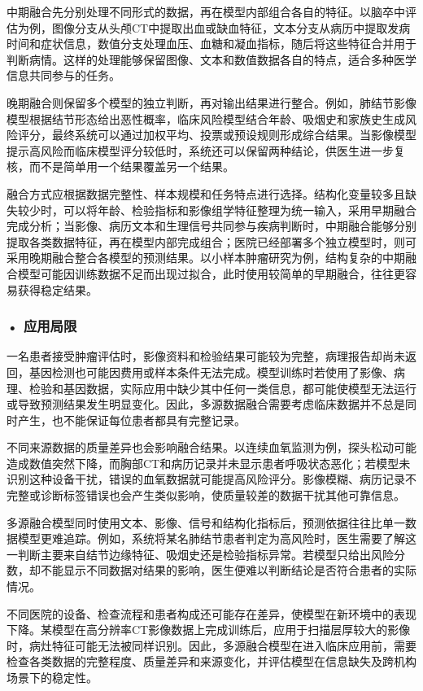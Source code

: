 中期融合先分别处理不同形式的数据，再在模型内部组合各自的特征。以脑卒中评估为例，图像分支从头颅CT中提取出血或缺血特征，文本分支从病历中提取发病时间和症状信息，数值分支处理血压、血糖和凝血指标，随后将这些特征合并用于判断病情。这样的处理能够保留图像、文本和数值数据各自的特点，适合多种医学信息共同参与的任务。

晚期融合则保留多个模型的独立判断，再对输出结果进行整合。例如，肺结节影像模型根据结节形态给出恶性概率，临床风险模型结合年龄、吸烟史和家族史生成风险评分，最终系统可以通过加权平均、投票或预设规则形成综合结果。当影像模型提示高风险而临床模型评分较低时，系统还可以保留两种结论，供医生进一步复核，而不是简单用一个结果覆盖另一个结果。

融合方式应根据数据完整性、样本规模和任务特点进行选择。结构化变量较多且缺失较少时，可以将年龄、检验指标和影像组学特征整理为统一输入，采用早期融合完成分析；当影像、病历文本和生理信号共同参与疾病判断时，中期融合能够分别提取各类数据特征，再在模型内部完成组合；医院已经部署多个独立模型时，则可采用晚期融合整合各模型的预测结果。以小样本肿瘤研究为例，结构复杂的中期融合模型可能因训练数据不足而出现过拟合，此时使用较简单的早期融合，往往更容易获得稳定结果。


\subsubsection*{\textbf{• 应用局限}}

一名患者接受肿瘤评估时，影像资料和检验结果可能较为完整，病理报告却尚未返回，基因检测也可能因费用或样本条件无法完成。模型训练时若使用了影像、病理、检验和基因数据，实际应用中缺少其中任何一类信息，都可能使模型无法运行或导致预测结果发生明显变化。因此，多源数据融合需要考虑临床数据并不总是同时产生，也不能保证每位患者都具有完整记录。

不同来源数据的质量差异也会影响融合结果。以连续血氧监测为例，探头松动可能造成数值突然下降，而胸部CT和病历记录并未显示患者呼吸状态恶化；若模型未识别这种设备干扰，错误的血氧数据就可能提高风险评分。影像模糊、病历记录不完整或诊断标签错误也会产生类似影响，使质量较差的数据干扰其他可靠信息。

多源融合模型同时使用文本、影像、信号和结构化指标后，预测依据往往比单一数据模型更难追踪。例如，系统将某名肺结节患者判定为高风险时，医生需要了解这一判断主要来自结节边缘特征、吸烟史还是检验指标异常。若模型只给出风险分数，却不能显示不同数据对结果的影响，医生便难以判断结论是否符合患者的实际情况。

不同医院的设备、检查流程和患者构成还可能存在差异，使模型在新环境中的表现下降。某模型在高分辨率CT影像数据上完成训练后，应用于扫描层厚较大的影像时，病灶特征可能无法被同样识别。因此，多源融合模型在进入临床应用前，需要检查各类数据的完整程度、质量差异和来源变化，并评估模型在信息缺失及跨机构场景下的稳定性。

